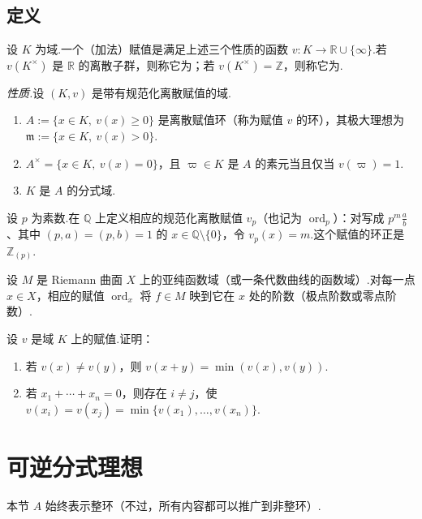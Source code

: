 \subsection{定义}\label{sec:nt-3-1-2}
\begin{definition*}
设 $K$ 为域.一个（加法）赋值是满足上述三个性质的函数 $v\colon K\longrightarrow\mathbb R\cup\{\infty\}$.若 $v(K^\times)$ 是 $\mathbb R$ 的离散子群，则称它为；若 $v(K^\times)=\mathbb Z$，则称它为.
\end{definition*}
\emph{性质.}设 $(K,v)$ 是带有规范化离散赋值的域.
\begin{enumerate}[label=\roman*)]
\item $A:=\{x\in K,\ v(x)\ge0\}$ 是离散赋值环（称为赋值 $v$ 的环），其极大理想为 $\mathfrak m:=\{x\in K,\ v(x)>0\}$.
\item $A^\times=\{x\in K,\ v(x)=0\}$，且 $\varpi\in K$ 是 $A$ 的素元当且仅当 $v(\varpi)=1$.
\item $K$ 是 $A$ 的分式域.
\end{enumerate}
\begin{example*}
设 $p$ 为素数.在 $\mathbb Q$ 上定义相应的规范化离散赋值 $v_p$（也记为 $\operatorname{ord}_p$）：对写成 $p^m\frac ab$、其中 $(p,a)=(p,b)=1$ 的 $x\in\mathbb Q\setminus\{0\}$，令 $v_p(x)=m$.这个赋值的环正是 $\mathbb Z_{(p)}$.
\end{example*}
\begin{example*}
设 $M$ 是 Riemann 曲面 $X$ 上的亚纯函数域（或一条代数曲线的函数域）.对每一点 $x\in X$，相应的赋值 $\operatorname{ord}_x$ 将 $f\in M$ 映到它在 $x$ 处的阶数（极点阶数或零点阶数）.
\end{example*}
\begin{exercise*}
设 $v$ 是域 $K$ 上的赋值.证明：
\begin{enumerate}[label=\roman*)]
\item 若 $v(x)\ne v(y)$，则 $v(x+y)=\min(v(x),v(y))$.
\item 若 $x_1+\cdots+x_n=0$，则存在 $i\ne j$，使 $v(x_i)=v(x_j)=\min\{v(x_1),\ldots,v(x_n)\}$.
\end{enumerate}
\end{exercise*}

\section{可逆分式理想}\label{sec:nt-3-2}
本节 $A$ 始终表示整环（不过，所有内容都可以推广到非整环）.
